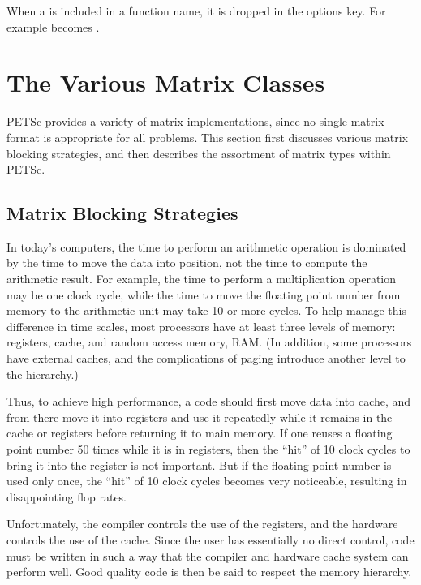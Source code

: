 \documentclass[twoside,12pt]{../sty/report_petsc}
\newcommand{\sindex}[1]{\index{#1}}
\begin{document}
When a  is included in a function name, it is dropped in the options key.
For example  becomes .

\chapter{The Various Matrix Classes}
\label{sec:matclasses}

PETSc provides a variety of matrix implementations, since no single
matrix format is appropriate for all problems.  This section first
discusses various matrix blocking strategies, and then 
describes the assortment of matrix types within PETSc.

\section{Matrix Blocking Strategies}
\sindex{matrix blocking} 
\sindex{blocking} 

In today's computers, the time to perform an arithmetic operation is
dominated by the time to move the data into position, not the time to
compute the arithmetic result.  For example, the time to perform a
multiplication operation may be one clock cycle, while the time to
move the floating point number from memory to the arithmetic unit may
take 10 or more cycles. To help manage this difference in time scales,
most processors have at least three levels of memory: registers,
cache, and random access memory, RAM. (In addition, some processors
have external caches, and the complications of paging introduce
another level to the hierarchy.)

Thus, to achieve high performance, a code should first move data into
cache, and from there move it into registers and use it repeatedly
while it remains in the cache or registers before returning it to main
memory. If one reuses a floating point number 50 times while it is in
registers, then the ``hit'' of 10 clock cycles to bring it into the
register is not important. But if the floating point number is used
only once, the ``hit'' of 10 clock cycles becomes very noticeable,
resulting in disappointing flop rates.

Unfortunately, the compiler controls the use of the registers, and the
hardware controls the use of the cache. Since the user has essentially
no direct control, code must be written in such a way that the
compiler and hardware cache system can perform well. Good quality code
is then be said to respect the memory hierarchy.
\end{document}
